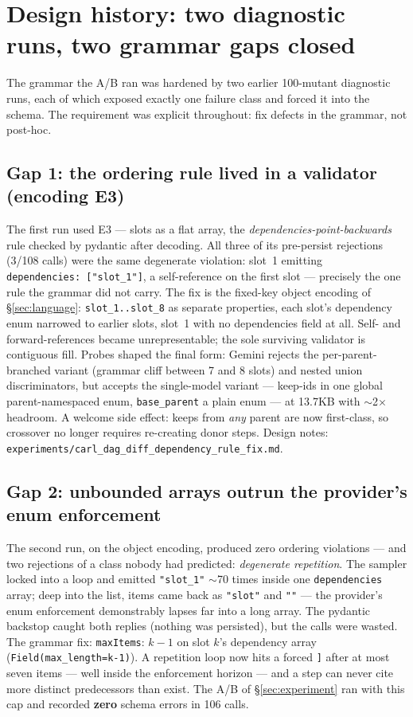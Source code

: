\documentclass[11pt]{article}
\begin{document}
\section{Design history: two diagnostic runs, two grammar gaps closed}
\label{sec:depfix}
The grammar the A/B ran was hardened by two earlier 100-mutant diagnostic runs, each of
which exposed exactly one failure class and forced it into the schema. The requirement was
explicit throughout: fix defects in the grammar, not post-hoc.

\subsection{Gap 1: the ordering rule lived in a validator (encoding E3)}
The first run used E3 --- slots as a flat array, the \emph{dependencies-point-backwards}
rule checked by pydantic after decoding. All three of its pre-persist rejections (3/108
calls) were the same degenerate violation: slot~1 emitting
\texttt{dependencies:\ ["slot\_1"]}, a self-reference on the first slot --- precisely the
one rule the grammar did not carry. The fix is the fixed-key object encoding of
\S\ref{sec:language}: \texttt{slot\_1..slot\_8} as separate properties, each slot's
dependency enum narrowed to earlier slots, slot~1 with no dependencies field at all.
Self- and forward-references became unrepresentable; the sole surviving validator is
contiguous fill. Probes shaped the final form: Gemini rejects the per-parent-branched
variant (grammar cliff between 7 and 8 slots) and nested union discriminators, but accepts
the single-model variant --- keep-ids in one global parent-namespaced enum,
\texttt{base\_parent} a plain enum --- at 13.7KB with $\sim$2$\times$ headroom. A welcome
side effect: keeps from \emph{any} parent are now first-class, so crossover no longer
requires re-creating donor steps. Design notes:
\texttt{experiments/carl\_dag\_diff\_dependency\_rule\_fix.md}.

\subsection{Gap 2: unbounded arrays outrun the provider's enum enforcement}
The second run, on the object encoding, produced zero ordering violations --- and two
rejections of a class nobody had predicted: \emph{degenerate repetition}. The sampler
locked into a loop and emitted \texttt{"slot\_1"} $\sim$70 times inside one
\texttt{dependencies} array; deep into the list, items came back as \texttt{"slot"} and
\texttt{""} --- the provider's enum enforcement demonstrably lapses far into a long array.
The pydantic backstop caught both replies (nothing was persisted), but the calls were
wasted. The grammar fix: \texttt{maxItems}: $k-1$ on slot $k$'s dependency array
(\texttt{Field(max\_length=k-1)}). A repetition loop now hits a forced \texttt{]} after at
most seven items --- well inside the enforcement horizon --- and a step can never cite more
distinct predecessors than exist. The A/B of \S\ref{sec:experiment} ran with this cap and
recorded \textbf{zero} schema errors in 106 calls.
\end{document}
